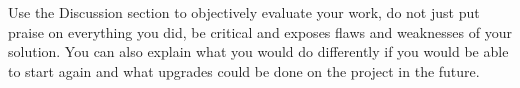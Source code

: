\documentclass[fleqn,moreauthors,10pt]{ds_report}
\begin{document}
Use the Discussion section to objectively evaluate your work, do not just put praise on everything you did, be critical and exposes flaws and weaknesses of your solution. You can also explain what you would do differently if you would be able to start again and what upgrades could be done on the project in the future.

\end{document}
